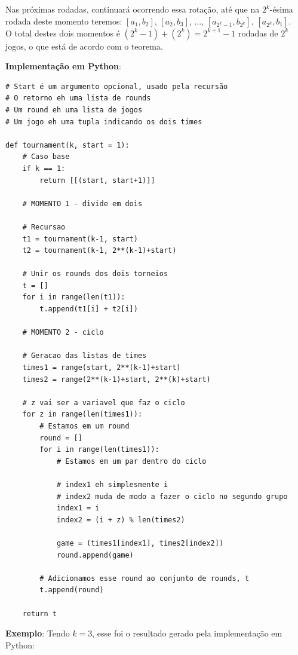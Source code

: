 \documentclass{article}
\begin{document}
Nas próximas rodadas, continuará ocorrendo essa rotação, até que na $2^k$-ésima rodada deste momento teremos: $[a_1, b_2]$, $[a_2, b_3]$, ..., $[a_{2^k-1}, b_{2^k}]$, $[a_{2^k}, b_1]$.\\

O total destes dois momentos é $(2^k -1) + (2^k) = 2^{k+1} - 1$ rodadas de $2^k$ jogos, o que está de acordo com o teorema.

\pagebreak

\textbf{Implementação em Python}:

{\color{ogreen}
\begin{verbatim}
# Start é um argumento opcional, usado pela recursão
# O retorno eh uma lista de rounds
# Um round eh uma lista de jogos
# Um jogo eh uma tupla indicando os dois times

def tournament(k, start = 1):
    # Caso base
    if k == 1:
        return [[(start, start+1)]]

    # MOMENTO 1 - divide em dois
    
    # Recursao
    t1 = tournament(k-1, start)
    t2 = tournament(k-1, 2**(k-1)+start)

    # Unir os rounds dos dois torneios
    t = []
    for i in range(len(t1)):
        t.append(t1[i] + t2[i])

    # MOMENTO 2 - ciclo
    
    # Geracao das listas de times
    times1 = range(start, 2**(k-1)+start)
    times2 = range(2**(k-1)+start, 2**(k)+start)
    
    # z vai ser a variavel que faz o ciclo
    for z in range(len(times1)):
        # Estamos em um round
        round = []
        for i in range(len(times1)):
            # Estamos em um par dentro do ciclo
            
            # index1 eh simplesmente i
            # index2 muda de modo a fazer o ciclo no segundo grupo
            index1 = i
            index2 = (i + z) % len(times2)

            game = (times1[index1], times2[index2])
            round.append(game)

        # Adicionamos esse round ao conjunto de rounds, t
        t.append(round)

    return t
\end{verbatim}
}

\pagebreak

\textbf{Exemplo}: Tendo $k = 3$, esse foi o resultado gerado pela implementação em Python:\\
\end{document}
